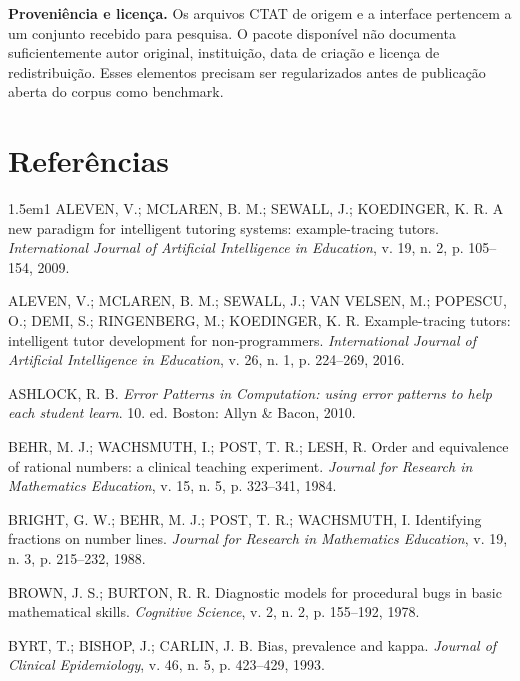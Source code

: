 \documentclass[11pt,a4paper]{article}
\begin{document}
\textbf{Proveniência e licença.} Os arquivos CTAT de origem e a interface pertencem a um conjunto recebido para pesquisa. O pacote disponível não documenta suficientemente autor original, instituição, data de criação e licença de redistribuição. Esses elementos precisam ser regularizados antes de publicação aberta do corpus como benchmark.

\section*{Referências}
\begingroup\raggedright{}
\begin{hangparas}{1.5em}{1}
ALEVEN, V.; MCLAREN, B. M.; SEWALL, J.; KOEDINGER, K. R. A new paradigm for intelligent tutoring systems: example-tracing tutors. \emph{International Journal of Artificial Intelligence in Education}, v. 19, n. 2, p. 105--154, 2009.\par

ALEVEN, V.; MCLAREN, B. M.; SEWALL, J.; VAN VELSEN, M.; POPESCU, O.; DEMI, S.; RINGENBERG, M.; KOEDINGER, K. R. Example-tracing tutors: intelligent tutor development for non-programmers. \emph{International Journal of Artificial Intelligence in Education}, v. 26, n. 1, p. 224--269, 2016.\par

ASHLOCK, R. B. \emph{Error Patterns in Computation: using error patterns to help each student learn}. 10. ed. Boston: Allyn \& Bacon, 2010.\par

BEHR, M. J.; WACHSMUTH, I.; POST, T. R.; LESH, R. Order and equivalence of rational numbers: a clinical teaching experiment. \emph{Journal for Research in Mathematics Education}, v. 15, n. 5, p. 323--341, 1984.\par

BRIGHT, G. W.; BEHR, M. J.; POST, T. R.; WACHSMUTH, I. Identifying fractions on number lines. \emph{Journal for Research in Mathematics Education}, v. 19, n. 3, p. 215--232, 1988.\par

BROWN, J. S.; BURTON, R. R. Diagnostic models for procedural bugs in basic mathematical skills. \emph{Cognitive Science}, v. 2, n. 2, p. 155--192, 1978.\par

BYRT, T.; BISHOP, J.; CARLIN, J. B. Bias, prevalence and kappa. \emph{Journal of Clinical Epidemiology}, v. 46, n. 5, p. 423--429, 1993.\par


\end{hangparas}
\end{document}
